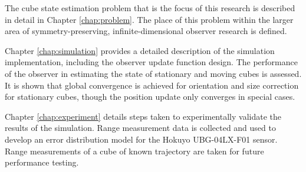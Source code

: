 The cube state estimation problem that is the focus of this research is described in detail in Chapter \ref{chap:problem}. The place of this problem within the larger area of symmetry-preserving, infinite-dimensional observer research is defined.  

Chapter \ref{chap:simulation} provides a detailed description of the simulation implementation, including the observer update function design. The performance of the observer in estimating the state of stationary and moving cubes is assessed. It is shown that global convergence is achieved for orientation and size correction for stationary cubes, though the position update only converges in special cases.

Chapter \ref{chap:experiment} details steps taken to experimentally validate the results of the simulation. Range measurement data is collected and used to develop an error distribution model for the Hokuyo UBG-04LX-F01 sensor. Range measurements of a cube of known trajectory are taken for future performance testing.


